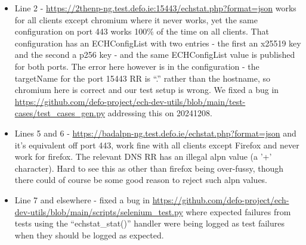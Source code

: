 \begin{itemize}
\item Line 2 - \url{https://2thenp-ng.test.defo.ie:15443/echstat.php?format=json} works for all
    clients except chromium where it never works, yet the same configuration on port 443 works
    100\% of the time on all clients. That configuration has an ECHConfigList with two
    entries - the first an x25519 key and the second a p256 key - and the same ECHConfigList 
    value is published for both ports. The error here however is in the configuration - the
    targetName for the port 15443 RR is ``.'' rather than the hostname, so chromium here
    is correct and our test setup is wrong. We fixed a bug in 
    \url{https://github.com/defo-project/ech-dev-utils/blob/main/test-cases/test_cases_gen.py}
        addressing this on 20241208.\\
\item Lines 5 and 6 - \url{https://badalpn-ng.test.defo.ie/echstat.php?format=json} and
    it's equivalent off port 443, work fine with all clients except Firefox and never work
    for firefox. The relevant DNS RR has an illegal alpn value (a '+' character). Hard to
    see this as other than firefox being over-fussy, though there could of course be some
    good reason to reject such alpn values.
\item Line 7 and elsewhere - fixed a bug in 
    \url{https://github.com/defo-project/ech-dev-utils/blob/main/scripts/selenium_test.py} where
        expected failures from tests using the ``echstat\_stat()'' handler were being logged as 
        test failures when they should be logged as expected.
\end{itemize}

